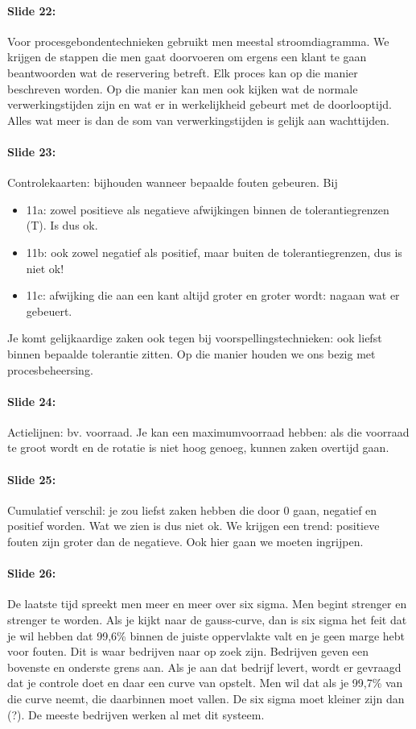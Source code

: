 \documentclass[10pt,a4paper]{report}
\begin{document}
\paragraph{Slide 22:} Voor procesgebondentechnieken gebruikt men meestal stroomdiagramma. We krijgen de stappen die men gaat doorvoeren om ergens een klant te gaan beantwoorden wat de reservering betreft. Elk proces kan op die manier beschreven worden. Op die manier kan men ook kijken wat de normale verwerkingstijden zijn en wat er in werkelijkheid gebeurt met de doorlooptijd. Alles wat meer is dan de som van verwerkingstijden is gelijk aan wachttijden.

\paragraph{Slide 23:} Controlekaarten: bijhouden wanneer bepaalde fouten gebeuren. Bij 
\begin{itemize}
\item 11a: zowel positieve als negatieve afwijkingen binnen de tolerantiegrenzen (T). Is dus ok. 
\item 11b: ook zowel negatief als positief, maar buiten de tolerantiegrenzen, dus is niet ok! 
\item 11c: afwijking die aan een kant altijd groter en groter wordt: nagaan wat er gebeuert.
\end{itemize} 
Je komt gelijkaardige zaken ook tegen bij voorspellingstechnieken: ook liefst binnen bepaalde tolerantie zitten. Op die manier houden we ons bezig met procesbeheersing.

\paragraph{Slide 24:} Actielijnen: bv. voorraad. Je kan een maximumvoorraad hebben: als die voorraad te groot wordt en de rotatie is niet hoog genoeg, kunnen zaken overtijd gaan. 

\paragraph{Slide 25:} Cumulatief verschil: je zou liefst zaken hebben die door 0 gaan, negatief en positief worden. Wat we zien is dus niet ok. We krijgen een trend: positieve fouten zijn groter dan de negatieve. Ook hier gaan we moeten ingrijpen.

\paragraph{Slide 26:} De laatste tijd spreekt men meer en meer over  six sigma. Men begint strenger en strenger te worden. Als je kijkt naar de gauss-curve, dan is six sigma het feit dat je wil hebben dat 99,6\% binnen de juiste oppervlakte valt en je geen marge hebt voor fouten. Dit is waar bedrijven naar op zoek zijn. Bedrijven geven een bovenste en onderste grens aan. Als je aan dat bedrijf levert, wordt er gevraagd dat je controle doet en daar een curve van opstelt. Men wil dat als je 99,7\% van die curve neemt, die daarbinnen moet vallen. De six sigma moet kleiner zijn dan (?). %
De meeste bedrijven werken al met dit systeem. 
\end{document}
